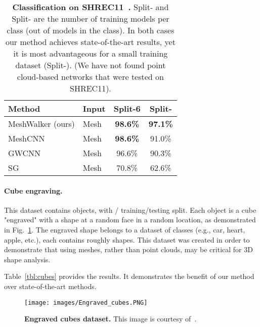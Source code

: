 \documentclass[acmtog]{acmart}
\begin{document}
\begin{table}[htb]\caption{{\bf Classification on SHREC11~\cite{lian2011shape}.}
 Split- and Split- are the number of training models per class (out of  models in the class).
 In both cases our method achieves state-of-the-art results, yet it is most advantageous for a small training dataset (Split-).
 (We have not found point cloud-based networks that were tested on SHREC11).
 }
\begin{center}
 \begin{tabular}
 {||l l c c||} 
 \hline
 Method & Input & Split-6  & Split-\\ [0.5ex] 
 \hline\hline\hline
 MeshWalker (ours) & Mesh & \textbf{98.6\%} & \textbf{97.1\%} \\ 
 \hline
 MeshCNN~\cite{hanocka2019meshcnn} & Mesh & \textbf{98.6\%} & 91.0\% \\
 \hline
 GWCNN~\cite{ezuz2017gwcnn} & Mesh & 96.6\% & 90.3\% \\
 \hline
 SG~\cite{bronstein2011shape} & Mesh & 70.8\% & 62.6\% \\
 \hline
 \hline
\end{tabular}
\label{tbl:shrec11}
\end{center}
\end{table}

\paragraph{Cube engraving.}
This dataset contains  objects, with / training/testing split.
Each object is a cube "engraved" with a shape at a random face in a random location, as demonstrated in Fig.~\ref{fig:cube}.
The engraved shape belongs to a dataset of  classes (e.g., car, heart, apple, etc.), each contains roughly  shapes. 
This dataset was created in order to demonstrate that using meshes, rather than point clouds, may be critical for 3D shape analysis.

Table~\ref{tbl:cubes} provides the results.
It demonstrates the benefit of our method over state-of-the-art methods.

\begin{figure}[htb] 
\centering 
\texttt{[image: images/Engraved\_cubes.PNG]}
\caption{{\bf Engraved cubes dataset.} 
This image is courtesy of~\cite{hanocka2019meshcnn}.
}
\label{fig:cube} 
\end{figure}
\end{document}
